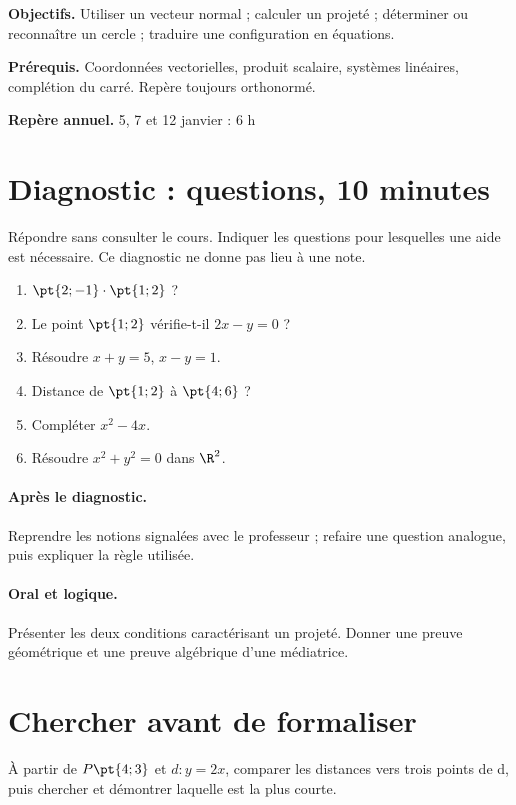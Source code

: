 \label{C07}
\begin{keypoint}
\textbf{Objectifs.} Utiliser un vecteur normal ; calculer un projeté ; déterminer ou reconnaître un cercle ; traduire une configuration en équations.

\textbf{Prérequis.} Coordonnées vectorielles, produit scalaire, systèmes linéaires, complétion du carré. Repère toujours orthonormé.

\textbf{Repère annuel.} 5, 7 et 12 janvier : 6 h\end{keypoint}
\section*{Diagnostic :  questions, 10 minutes}\label{C07-D}
Répondre sans consulter le cours. Indiquer les questions pour lesquelles une aide est nécessaire. Ce diagnostic ne donne pas lieu à une note.
\begin{enumerate}
\item $\pt{2;-1}\cdot\pt{1;2}$ ?
\item Le point $\pt{1;2}$ vérifie-t-il $2x-y=0$ ?
\item Résoudre $x+y=5$, $x-y=1$.
\item Distance de $\pt{1;2}$ à $\pt{4;6}$ ?
\item Compléter $x^2-4x$.
\item Résoudre $x^2+y^2=0$ dans $\R^2$.
\end{enumerate}
\paragraph{Après le diagnostic.} Reprendre les notions signalées avec le professeur ; refaire une question analogue, puis expliquer la règle utilisée.
\paragraph{Oral et logique.} Présenter les deux conditions caractérisant un projeté. Donner une preuve géométrique et une preuve algébrique d’une médiatrice.
\mxnewpage
\section*{Chercher avant de formaliser}\label{C07-RECH}
À partir de $P\pt{4;3}$ et $d:y=2x$, comparer les distances vers trois points de d, puis chercher et démontrer laquelle est la plus courte.
